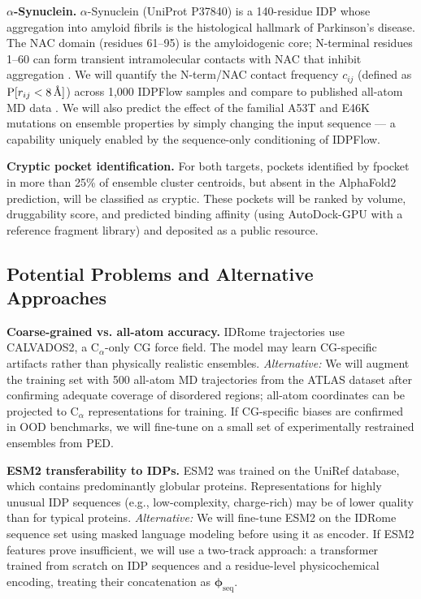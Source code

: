 \documentclass[12pt]{article}
\begin{document}
\noindent\textbf{$\alpha$-Synuclein.}
$\alpha$-Synuclein (UniProt P37840) is a 140-residue IDP whose aggregation into amyloid
fibrils is the histological hallmark of Parkinson's disease.
The NAC domain (residues 61--95) is the amyloidogenic core; N-terminal residues 1--60 can
form transient intramolecular contacts with NAC that inhibit aggregation
\cite{bhatt2021asyn}.
We will quantify the N-term/NAC contact frequency $c_{ij}$ (defined as $\mathrm{P}[r_{ij}
< 8\text{\,\AA}]$) across 1,000 IDPFlow samples and compare to published all-atom MD data
\cite{bhatt2021asyn}.
We will also predict the effect of the familial A53T and E46K mutations on ensemble
properties by simply changing the input sequence --- a capability uniquely enabled by the
sequence-only conditioning of IDPFlow.

\noindent\textbf{Cryptic pocket identification.}
For both targets, pockets identified by fpocket \cite{le2009fpocket} in more than 25\% of
ensemble cluster centroids, but absent in the AlphaFold2 prediction, will be classified as
cryptic.
These pockets will be ranked by volume, druggability score, and predicted binding
affinity (using AutoDock-GPU with a reference fragment library) and deposited as a
public resource.

\subsection{Potential Problems and Alternative Approaches}

\noindent\textbf{Coarse-grained vs. all-atom accuracy.}
IDRome trajectories use CALVADOS2, a C$_\alpha$-only CG force field.
The model may learn CG-specific artifacts rather than physically realistic ensembles.
\textit{Alternative:} We will augment the training set with 500 all-atom MD trajectories
from the ATLAS dataset \cite{vander2023atlas} after confirming adequate coverage of
disordered regions; all-atom coordinates can be projected to C$_\alpha$ representations
for training.
If CG-specific biases are confirmed in OOD benchmarks, we will fine-tune on a small set
of experimentally restrained ensembles from PED.

\noindent\textbf{ESM2 transferability to IDPs.}
ESM2 was trained on the UniRef database, which contains predominantly globular proteins.
Representations for highly unusual IDP sequences (e.g., low-complexity, charge-rich) may
be of lower quality than for typical proteins.
\textit{Alternative:} We will fine-tune ESM2 on the IDRome sequence set using masked
language modeling before using it as encoder.
If ESM2 features prove insufficient, we will use a two-track approach: a transformer trained
from scratch on IDP sequences and a residue-level physicochemical encoding, treating their
concatenation as $\boldsymbol{\phi}_\mathrm{seq}$.
\end{document}
